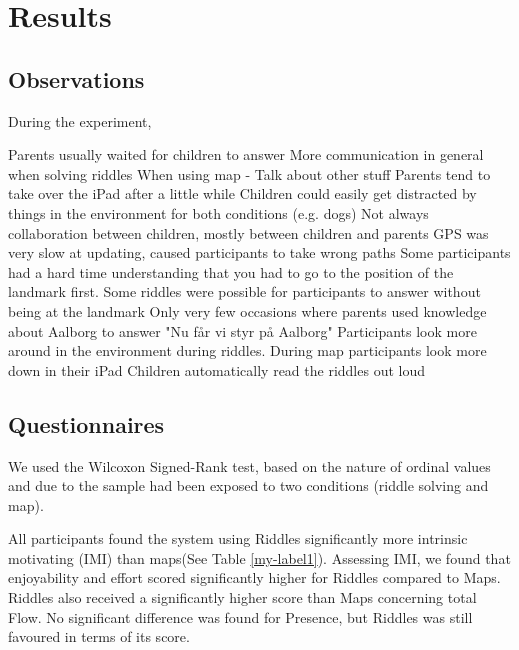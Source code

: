 \section{Results}

\subsection{Observations}
During the experiment, 

Parents usually waited for children to answer
More communication in general when solving riddles
When using map - Talk about other stuff
Parents tend to take over the iPad after a little while
Children could easily get distracted by things in the environment for both conditions (e.g. dogs)
Not always collaboration between children, mostly between children and parents
GPS was very slow at updating, caused participants to take wrong paths
Some participants had a hard time understanding that you had to go to the position of the landmark first.
Some riddles were possible for participants to answer without being at the landmark
Only very few occasions where parents used knowledge about Aalborg to answer
"Nu får vi styr på Aalborg"
Participants look more around in the environment during riddles. During map participants look more down in their iPad
Children automatically read the riddles out loud

\subsection{Questionnaires}
We used the Wilcoxon Signed-Rank test, based on the nature of ordinal values and due to the sample had been exposed to two conditions (riddle solving and map).

All participants found the system using Riddles significantly more intrinsic motivating (IMI) than maps(See Table \ref{my-label1}). Assessing IMI, we found that enjoyability and effort scored significantly higher for Riddles compared to Maps. Riddles also received a significantly higher score than Maps concerning total Flow. No significant difference was found for Presence, but Riddles was still favoured in terms of its score. 

